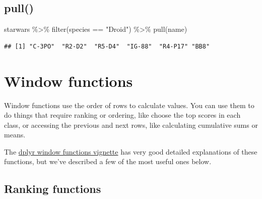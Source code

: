 \documentclass[
  oneside]{book}
\newenvironment{Shaded}{\begin{snugshade}}{\end{snugshade}}
\newcommand{\FunctionTok}[1]{\textcolor[rgb]{0.00,0.00,0.00}{#1}}
\newcommand{\NormalTok}[1]{#1}
\newcommand{\SpecialCharTok}[1]{\textcolor[rgb]{0.00,0.00,0.00}{#1}}
\newcommand{\StringTok}[1]{\textcolor[rgb]{0.31,0.60,0.02}{#1}}
\begin{document}
\hypertarget{pull}{%
\subsection{pull()}\label{pull}}

\begin{Shaded}
\begin{Highlighting}[]
\NormalTok{starwars }\SpecialCharTok{\%\textgreater{}\%}
  \FunctionTok{filter}\NormalTok{(species }\SpecialCharTok{==} \StringTok{"Droid"}\NormalTok{) }\SpecialCharTok{\%\textgreater{}\%}
  \FunctionTok{pull}\NormalTok{(name)}
\end{Highlighting}
\end{Shaded}

\begin{verbatim}
## [1] "C-3PO"  "R2-D2"  "R5-D4"  "IG-88"  "R4-P17" "BB8"
\end{verbatim}

\hypertarget{window}{%
\section{Window functions}\label{window}}

Window functions use the order of rows to calculate values. You can use them to do things that require ranking or ordering, like choose the top scores in each class, or accessing the previous and next rows, like calculating cumulative sums or means.

The \href{https://dplyr.tidyverse.org/articles/window-functions.html}{dplyr window functions vignette} has very good detailed explanations of these functions, but we've described a few of the most useful ones below.

\hypertarget{ranking-functions}{%
\subsection{Ranking functions}\label{ranking-functions}}
\end{document}

